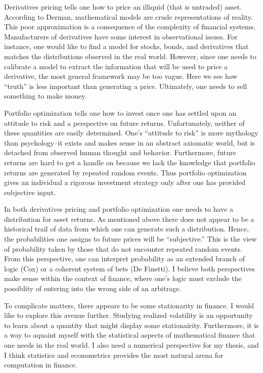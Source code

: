 \documentclass{report}
\begin{document}
Derivatives pricing tells one how to price an illiquid (that is
untraded) asset.  According to Derman, mathematical models are crude
representations of reality.  This poor approximation is a consequence
of the complexity of financial systems. Manufacturers of derivatives
have some interest in observational issues.  For instance, one would
like to find a model for stocks, bonds, and derivatives that matches
the distributions observed in the real world.  However, since one 
needs to calibrate a model to extract the information that will be
used to price a derivative, the most general framework may be too
vague.  Here we see how ``truth'' is less important than generating a
price.  Ultimately, one needs to sell something to make money.

Portfolio optimization tells one how to invest once one has settled 
upon an attitude to risk and a perspective on future returns. 
Unfortunately, neither of these quantities are easily determined. 
One's ``attitude to risk'' is more mythology than psychology--it
exists and makes sense in an abstract axiomatic world, but is detached
from observed human thought and behavior.  Furthermore, future returns
are hard to get a handle on because we lack the knowledge that
portfolio returns are generated by repeated random events.  Thus
portfolio optimization gives an individual a rigorous investment
strategy only after one has provided subjective input.

In both derivatives pricing and portfolio optimization one needs to
have a distribution for asset returns.  As mentioned above there does
not appear to be a historical trail of data from which one can
generate such a distribution.  Hence, the probabilities one assigns to
future prices will be ``subjective.''  This is the view of probability
taken by those that do not encounter repeated random events.  From
this perspective, one can interpret probability as an extended branch
of logic (Cox) or a coherent system of bets (De Finetti).  I believe
both perspectives make sense within the context of finance, where
one's logic must exclude the possiblity of entering into the wrong
side of an arbitrage.

To complicate matters, there appears to be some stationarity in
finance.  I would like to explore this avenue further.  Studying
realized volatility is an opportunity to learn about a quantity that
might display some stationairity.  Furthermore, it is a way to aquaint
myself with the statistical aspects of mathematical finance that one
needs in the real world.  I also need a numerical perspective for my
thesis, and I think statistics and econometrics provides the most
natural arena for computation in finance. 
\end{document}
